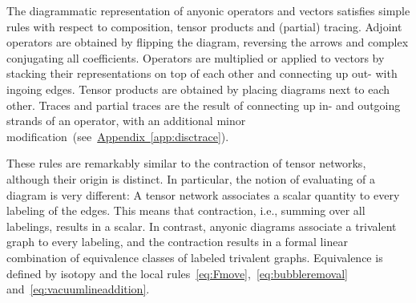 \documentclass[floats,prb,twocolumn]{revtex4}
\newcommand{\appref}[1]{\hyperref[#1]{{Appendix~\ref*{#1}}}}
\begin{document}
The diagrammatic representation of anyonic operators and vectors satisfies
simple rules with respect to composition, tensor products and (partial) tracing. Adjoint operators are obtained by flipping the diagram, reversing the arrows and complex conjugating all coefficients. Operators are multiplied or applied to vectors by stacking their representations on top of each other and connecting up out- with ingoing edges.   Tensor products are obtained by placing diagrams next to each other. Traces and partial traces are the result of connecting up  in- and outgoing strands of an operator, with an additional minor modification~(see~\appref{app:disctrace}).

These rules are remarkably similar to the contraction of tensor networks, although their origin is distinct. In particular, the notion of evaluating of a diagram is very different: A tensor network associates a scalar quantity to every labeling of the edges. This means that contraction, i.e.,  summing over all labelings, results in a scalar. In contrast, anyonic diagrams associate a trivalent graph to every labeling, and the contraction  results in a formal linear combination of equivalence classes of labeled trivalent graphs. Equivalence is defined by isotopy and the local rules~\eqref{eq:Fmove},~\eqref{eq:bubbleremoval} and~\eqref{eq:vacuumlineaddition}. 
  
\end{document}

